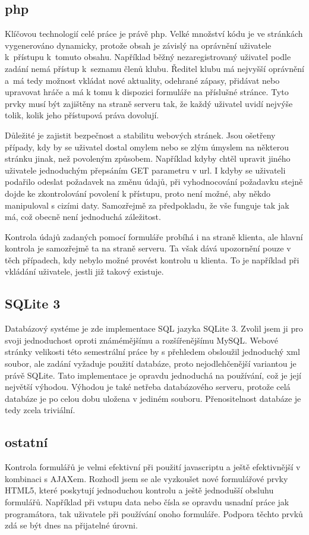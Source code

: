 \documentclass[12pt]{article}
\begin{document}
\subsection{php}
Klíčovou technologií celé práce je právě php. Velké množství kódu je ve
stránkách vygenerováno dynamicky, protože obsah je závislý na oprávnění
uživatele k~přístupu k~tomuto obsahu. Například běžný nezaregistrovaný uživatel
podle zadání nemá přístup k~seznamu členů klubu. Ředitel klubu má nejvyšší
oprávnění a~má tedy možnost vkládat nové aktuality, odehrané zápasy, přidávat
nebo upravovat hráče a má k tomu k dispozici formuláře na příslušné stránce.
Tyto prvky musí být zajištěny na straně serveru tak, že každý uživatel uvidí
nejvýše tolik, kolik jeho přístupová práva dovolují.

Důležité je zajistit bezpečnost a stabilitu webových stránek. Jsou ošetřeny
případy, kdy by se uživatel dostal omylem nebo se zlým úmyslem na některou
stránku jinak, než povoleným způsobem. Například kdyby chtěl upravit jiného
uživatele jednoduchým přepsáním GET parametru v url. I kdyby se uživateli
podařilo odeslat požadavek na změnu údajů, při vyhodnocování požadavku stejně
dojde ke zkontrolování povolení k přístupu, proto není možné, aby někdo
manipuloval s cizími daty. Samozřejmě za předpokladu, že vše funguje tak jak
má, což obecně není jednoduchá záležitost.

Kontrola údajů zadaných pomocí formuláře probíhá i na straně klienta,
ale hlavní kontrola je samozřejmě ta na straně serveru. Ta však dává upozornění
pouze v těch případech, kdy nebylo možné provést kontrolu u klienta. To je
například při vkládání uživatele, jestli již takový existuje.

\subsection{SQLite 3}
Databázový systéme je zde implementace SQL jazyka SQLite 3. Zvolil jsem ji pro
svoji jednoduchost oproti známémějšímu a rozšířenějšímu MySQL. Webové stránky
velikosti této semestrální práce by s přehledem obsloužil jednoduchý xml
soubor, ale zadání vyžaduje použití databáze, proto nejodlehčenější variantou
je právě SQLite. Tato implementace je opravdu jednoduchá na používání, což je
její největší výhodou. Výhodou je také netřeba databázového serveru, protože
celá databáze je po celou dobu uložena v jediném souboru. Přenositelnost
databáze je tedy zcela triviální.

\subsection{ostatní}
Kontrola formulářů je velmi efektivní při použití javascriptu a ještě
efektivnější v kombinaci s AJAXem. Rozhodl jsem se ale vyzkoušet nové
formulářové prvky HTML5, které poskytují jednoduchou kontrolu a ještě
jednodušší obsluhu formulářů. Například při vstupu data nebo čísla se opravdu
usnadní práce jak programátora, tak uživatele při používání onoho formuláře.
Podpora těchto prvků zdá se být dnes na přijatelné úrovni.
\end{document}
